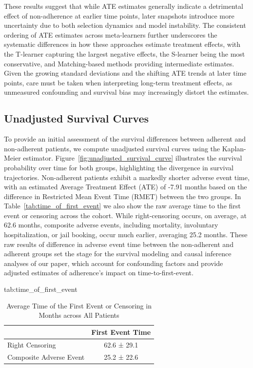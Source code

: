 These results suggest that while ATE estimates generally indicate a detrimental effect of non-adherence at earlier time points, later snapshots introduce more uncertainty due to both selection dynamics and model instability. The consistent ordering of ATE estimates across meta-learners further underscores the systematic differences in how these approaches estimate treatment effects, with the T-learner capturing the largest negative effects, the S-learner being the most conservative, and Matching-based methods providing intermediate estimates. Given the growing standard deviations and the shifting ATE trends at later time points, care must be taken when interpreting long-term treatment effects, as unmeasured confounding and survival bias may increasingly distort the estimates.

\subsection{Unadjusted Survival Curves}
\label{apd:unadjusted_survival}

To provide an initial assessment of the survival differences between adherent and non-adherent patients, we compute unadjusted survival curves using the Kaplan-Meier estimator. 
Figure~\ref{fig:unadjusted_survival_curve} illustrates the survival probability over time for both groups, highlighting the divergence in survival trajectories. 
Non-adherent patients exhibit a markedly shorter adverse event time, with an estimated Average Treatment Effect (ATE) of -7.91 months based on the difference in Restricted Mean Event Time (RMET) between the two groups. 
In Table~\ref{tab:time_of_first_event} we also show the raw average time to the first event or censoring across the cohort. 
While right-censoring occurs, on average, at 62.6 months, composite adverse events, including mortality, involuntary hospitalization, or jail booking, occur much earlier, averaging 25.2 months. 
These raw results of difference in adverse event time between the non-adherent and adherent groups set the stage for the survival modeling and causal inference analyses of our paper, which account for confounding factors and provide adjusted estimates of adherence's impact on time-to-first-event.

\begin{table}[hbtp]
    \setlength{\tabcolsep}{4pt}
    \footnotesize
    \floatconts
      {tab:time_of_first_event}
      {\caption{Average Time of the First Event or Censoring in Months across All Patients}}
      {\begin{tabular}{l c}
    \toprule
    & First Event Time \\
    \midrule
    Right Censoring & 62.6 ± 29.1 \\
    Composite Adverse Event &  25.2 ± 22.6  \\
    \bottomrule
    \end{tabular}}
\end{table}


